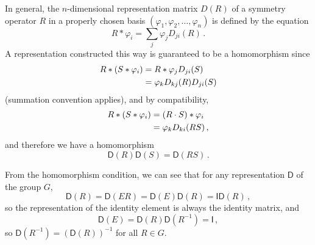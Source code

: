 \documentclass{article}
\theoremstyle{plain}\theoremheaderfont{\normalfont\itshape}\theorembodyfont{\rmfamily}\theoremseparator{.}\newtheorem*{rem}{Remark}\newtheorem*{ex}{Example}\newtheorem*{proof}{Proof}\newtheorem*{altp}{Alternative proof}
\theoremstyle{plain}\theoremheaderfont{\normalfont\bfseries}\theorembodyfont{\rmfamily}\theoremseparator{.}\newtheorem{thm}{Theorem}[section]\newtheorem{lem}[thm]{Lemma}\newtheorem{prop}[thm]{Proposition}\newtheorem*{cor}{Corollary}\newtheorem{defn}[thm]{Definition}\newtheorem{clm}[thm]{Claim}\newtheorem{clminproof}{Claim}\newtheorem*{law}{Law}\newtheorem{pos}[thm]{Postulate}
\theoremstyle{break}\theoremheaderfont{\normalfont\itshape}\theorembodyfont{\rmfamily}\theoremseparator{.\medskip}\newtheorem*{proofskip}{Proof}\newtheorem*{exs}{Examples}\newtheorem*{rems}{Remarks}
\theoremstyle{break}\theoremheaderfont{\normalfont\bfseries}\theorembodyfont{\rmfamily}\theoremseparator{.\medskip}\newtheorem{lemskip}[thm]{Lemma}\newtheorem{defnskip}[thm]{Definition}\newtheorem{propskip}[thm]{Proposition}\newtheorem{thmskip}[thm]{Theorem}
\numberwithin{equation}{section}
\newcommand{\DD}{\mathsf{D}}
\newcommand{\II}{\mathsf{I}}
\begin{document}
    In general, the \(n\)-dimensional representation matrix \(D(R)\) of a symmetry operator \(R\) in a properly chosen basis \((\varphi_1,\varphi_2,\dots,\varphi_n)\) is defined by the equation
    \begin{equation}
        R*\varphi_i=\sum_j\varphi_j D_{ji}(R)\,.
    \end{equation}
    A representation constructed this way is guaranteed to be a homomorphism since
    \begin{align}
        R*(S*\varphi_i)&=R*\varphi_j D_{ji}(S)\notag \\
        &=\varphi_k D_{kj}(R)D_{ji}(S)
    \end{align}
    (summation convention applies), and by compatibility,
    \begin{align}
        R*(S*\varphi_i)&=(R\cdot S)*\varphi_i\notag \\
        &=\varphi_k D_{ki}(RS)\,,
    \end{align}
    and therefore we have a homomorphism
    \begin{equation}
        \DD(R)\DD(S)=\DD(RS)\,.
    \end{equation}

    From the homomorphism condition, we can see that for any representation \(\DD\) of the group \(G\),
    \begin{equation}
        \DD(R)=\DD(ER)=\DD(E)\DD(R)=\II\DD(R)\,,
    \end{equation}
    so the representation of the identity element is always the identity matrix, and
    \begin{equation}
        \DD(E)=\DD(R)\DD(R^{-1})=\II\,,
    \end{equation}
    so \(\DD(R^{-1})=(\DD(R))^{-1}\) for all \(R\in G\).
\end{document}
